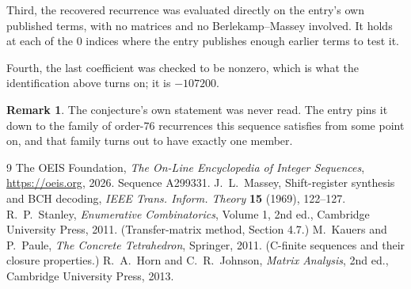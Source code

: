 \documentclass[11pt,a4paper]{article}
\theoremstyle{plain}
\theoremstyle{definition}
\newtheorem{remark}[theorem]{Remark}
\begin{document}
Third, the recovered recurrence was evaluated directly on the entry's own published terms, with
no matrices and no Berlekamp--Massey involved. It holds at each of the $0$ indices where
the entry publishes enough earlier terms to test it.

Fourth, the last coefficient was checked to be nonzero, which is what the identification above
turns on; it is $-107200$.

\begin{remark}
The conjecture's own statement was never read. The entry pins it down to the family of
order-$76$ recurrences this sequence satisfies from some point on, and that family turns
out to have exactly one member.
\end{remark}

\begin{thebibliography}{9}
 The OEIS Foundation, \emph{The On-Line Encyclopedia of Integer
Sequences}, \url{https://oeis.org}, 2026. Sequence A299331.
 J.~L.~Massey, Shift-register synthesis and BCH decoding, \emph{IEEE
Trans. Inform. Theory} \textbf{15} (1969), 122--127.
 R.~P.~Stanley, \emph{Enumerative Combinatorics}, Volume 1, 2nd ed.,
Cambridge University Press, 2011. (Transfer-matrix method, Section 4.7.)
 M.~Kauers and P.~Paule, \emph{The Concrete Tetrahedron}, Springer, 2011.
(C-finite sequences and their closure properties.)
 R.~A.~Horn and C.~R.~Johnson, \emph{Matrix Analysis}, 2nd ed., Cambridge
University Press, 2013.
\end{thebibliography}
\end{document}
